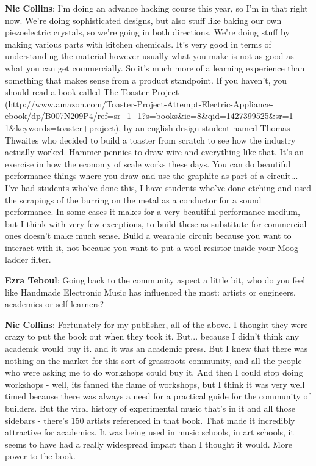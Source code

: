 \textbf{Nic Collins}: I’m doing an advance hacking course this year, so I’m in that right now. We’re doing sophisticated designs, but also stuff like baking our own piezoelectric crystals, so we’re going in both directions. We’re doing stuff by making various parts with kitchen chemicals. It’s very good in terms of understanding the material however usually what you make is not as good as what you can get commercially. So it’s much more of a learning experience than something that makes sense from a product standpoint. If you haven’t, you should read a book called The Toaster Project (http://www.amazon.com/Toaster-Project-Attempt-Electric-Appliance-ebook/dp/B007N209P4/ref=sr_1_1?s=books&ie=8&qid=1427399525&sr=1-1&keywords=toaster+project), by an english design student named Thomas Thwaites who decided to build a toaster from scratch to see how the industry actually worked. Hammer pennies to draw wire and everything like that. It’s an exercise in how the economy of scale works these days. You can do beautiful performance things where you draw and use the graphite as part of a circuit... I’ve had students who’ve done this, I have students who’ve done etching and used the scrapings of the burring on the metal as a conductor for a sound performance. In some cases it makes for a very beautiful performance medium, but I think with very few exceptions, to build these as substitute for commercial ones doesn’t make much sense. Build a wearable circuit because you want to interact with it, not because you want to put a wool resistor inside your Moog ladder filter.
					
\textbf{Ezra Teboul}: Going back to the community aspect a little bit, who do you feel like Handmade Electronic Music has influenced the most: artists or engineers, academics or self-learners?
					
\textbf{Nic Collins}: Fortunately for my publisher, all of the above. I thought they were crazy to put the book out when they took it. But... because I didn’t think any academic would buy it. and it was an academic press. But I knew that there was nothing on the market for this sort of grassroots community, and all the people who were asking me to do workshops could buy it. And then I could stop doing workshops - well, its fanned the flame of workshops, but I think it was very well timed because there was always a need for a practical guide for the community of builders. But the viral history of experimental music that’s in it and all those sidebars - there’s 150 artists referenced in that book. That made it incredibly attractive for academics. It was being used in music schools, in art schools, it seems to have had a really widespread impact than I thought it would. More power to the book.
					
